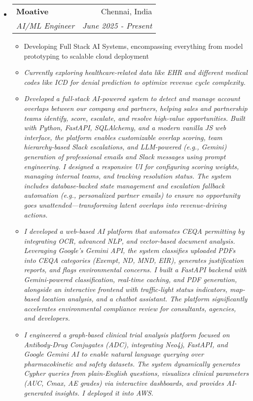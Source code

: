 \documentclass[letterpaper,11pt]{article}
\makeatletter
\newcommand{\resitem}[1]{\item #1 \vspace{-2pt}}
\newcommand{\resheading}[1]{\textbf{\sffamily{\mbox{~}{\large #1} \vphantom{p\^{E}}}}}
\newcommand{\ressubheading}[4]{
\begin{tabular*}{6.5in}{l@{\extracolsep{\fill}}r}
    \textbf{#1} & #2 \\
    \textit{#3} & \textit{#4} \\
\end{tabular*}\vspace{-4pt}} %
\makeatother
\begin{document}
\vspace{2mm}
\resheading{Work Experience}
\begin{itemize}
\item[]
    \ressubheading{Moative}{Chennai, India}{AI/ML Engineer}{June 2025 - Present}
    \begin{itemize}
        \resitem{Developing Full Stack AI Systems, encompassing everything from model prototyping to scalable cloud deployment}
        \resitem{\textit{Currently exploring healthcare-related data like EHR and different medical codes like ICD for denial prediction to optimize revenue cycle complexity.}}
        \resitem{\textit{Developed a full-stack AI-powered system to detect and manage account overlaps between our company and partners, helping sales and partnership teams identify, score, escalate, and resolve high-value opportunities. Built with Python, FastAPI, SQLAlchemy, and a modern vanilla JS web interface, the platform enables customizable overlap scoring, team hierarchy-based Slack escalations, and LLM-powered (e.g., Gemini) generation of professional emails and Slack messages using prompt engineering. I designed a responsive UI for configuring scoring weights, managing internal teams, and tracking resolution status. The system includes database-backed state management and escalation fallback automation (e.g., personalized partner emails) to ensure no opportunity goes unattended—transforming latent overlaps into revenue-driving actions.}}
	\resitem{\textit{I developed a web-based AI platform that automates CEQA permitting by integrating OCR, advanced NLP, and vector-based document analysis. Leveraging Google's Gemini API, the system classifies uploaded PDFs into CEQA categories (Exempt, ND, MND, EIR), generates justification reports, and flags environmental concerns. I built a FastAPI backend with Gemini-powered classification, real-time caching, and PDF generation, alongside an interactive frontend with traffic-light status indicators, map-based location analysis, and a chatbot assistant. The platform significantly accelerates environmental compliance review for consultants, agencies, and developers.}}
	\resitem{\textit{I engineered a graph-based clinical trial analysis platform focused on Antibody-Drug Conjugates (ADC), integrating Neo4j, FastAPI, and Google Gemini AI to enable natural language querying over pharmacokinetic and safety datasets. The system dynamically generates Cypher queries from plain-English questions, visualizes clinical parameters (AUC, Cmax, AE grades) via interactive dashboards, and provides AI-generated insights. I deployed it into AWS.}}

\end{itemize}
\end{itemize}
\end{document}
